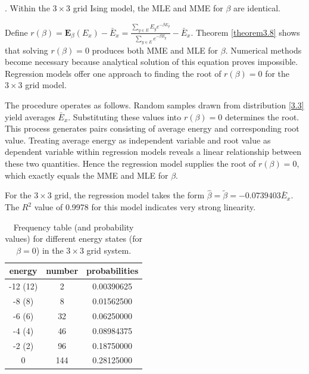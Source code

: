 \documentclass[twoside]{article}
\begin{document}
\begin{thm} \label{theorem3.8}
\citep{shams}. Within the $3\times 3$ grid Ising model, the MLE and MME for $\beta$ are identical.
\end{thm}

Define $r\left( \beta \right) = {\boldsymbol{E}_{\beta }}\left( {{E}_{x}} \right) - {{\bar{E}}_{x}} = \frac{\sum\nolimits_{y\in E}{{{E}_{y}}{{e}^{-\beta {{E}_{y}}}}}}{\sum\nolimits_{y\in E}{{{e}^{-\beta {{E}_{y}}}}}} - {{\bar{E}}_{x}}$.
Theorem \ref{theorem3.8} shows that solving $r\left( \beta \right)=0$ produces both MME and MLE for $\beta$. Numerical methods become necessary because analytical solution of this equation proves impossible. Regression models offer one approach to finding the root of $r\left( \beta \right)=0$ for the $3\times 3$ grid model.

The procedure operates as follows. Random samples drawn from distribution \eqref{3.3} yield averages ${{\bar{E}}_{x}}$. Substituting these values into $r\left( \beta \right)=0$ determines the root. This process generates pairs consisting of average energy and corresponding root value. Treating average energy as independent variable and root value as dependent variable within regression models reveals a linear relationship between these two quantities. Hence the regression model supplies the root of $r\left( \beta \right)=0$, which exactly equals the MME and MLE for $\beta$.

For the $3\times 3$ grid, the regression model takes the form
$\hat{\beta} = \tilde{\beta} = -0.0739403 \bar{E}_x$.
The $R^{2}$ value of 0.9978 for this model indicates very strong linearity.

\begin{table}[h]
\centering
\begin{tabular}{|c|c|c|}
\hline
\textbf{energy} & \textbf{number} & \textbf{probabilities} \\ \hline
-12 (12) & 2 & 0.00390625 \\
-8 (8) & 8 & 0.01562500 \\
-6 (6) & 32 & 0.06250000 \\
-4 (4) & 46 & 0.08984375 \\
-2 (2) & 96 & 0.18750000 \\
0 & 144 & 0.28125000 \\
\hline
\end{tabular}
\caption{Frequency table (and probability values) for different energy states (for $\beta =0$) in the $3\times 3$ grid system.}
\label{table5.1}
\end{table}
\end{document}
